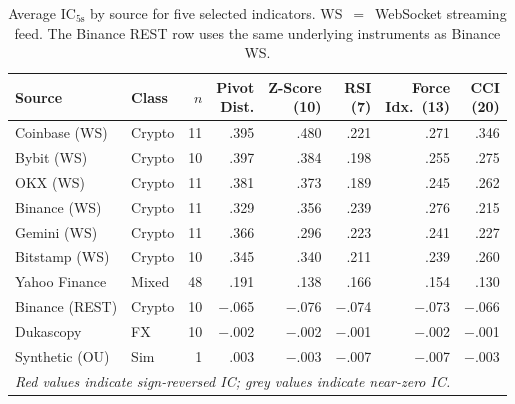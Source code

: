 \documentclass[12pt,a4paper]{article}
\theoremstyle{definition}
\theoremstyle{remark}
\newcommand{\IC}{\mathrm{IC}}
\begin{document}
\begin{table}[H]
\centering
\caption{Average $\IC_{5\text{s}}$ by source for five selected
  indicators. WS~$=$~WebSocket streaming feed. The Binance
  REST row uses the same underlying instruments as Binance WS.}
\label{tab:crossasset}
\small
\setlength{\tabcolsep}{5pt}
\begin{tabular}{llr@{\hspace{6pt}}rrrrr}
\toprule
\textbf{Source} & \textbf{Class} & $n$
  & \makecell{Pivot\\Dist.}
  & \makecell{Z-Score\\(10)}
  & \makecell{RSI\\(7)}
  & \makecell{Force\\Idx.\ (13)}
  & \makecell{CCI\\(20)} \\
\midrule
Coinbase (WS)  & Crypto & 11 & .395 & .480 & .221 & .271 & .346 \\
Bybit (WS)     & Crypto & 10 & .397 & .384 & .198 & .255 & .275 \\
OKX (WS)       & Crypto & 11 & .381 & .373 & .189 & .245 & .262 \\
Binance (WS)   & Crypto & 11 & .329 & .356 & .239 & .276 & .215 \\
Gemini (WS)    & Crypto & 11 & .366 & .296 & .223 & .241 & .227 \\
Bitstamp (WS)  & Crypto & 10 & .345 & .340 & .211 & .239 & .260 \\
Yahoo Finance  & Mixed  & 48 & .191 & .138 & .166 & .154 & .130 \\
\midrule
Binance (REST) & Crypto & 10
  & \textcolor{accent}{$-$.065}
  & \textcolor{accent}{$-$.076}
  & \textcolor{accent}{$-$.074}
  & \textcolor{accent}{$-$.073}
  & \textcolor{accent}{$-$.066} \\
Dukascopy      & FX     & 10
  & \textcolor{gray1}{$-$.002}
  & \textcolor{gray1}{$-$.002}
  & \textcolor{gray1}{$-$.001}
  & \textcolor{gray1}{$-$.002}
  & \textcolor{gray1}{$-$.001} \\
Synthetic (OU) & Sim    &  1
  & \textcolor{gray1}{.003}
  & \textcolor{gray1}{$-$.003}
  & \textcolor{gray1}{$-$.007}
  & \textcolor{gray1}{$-$.007}
  & \textcolor{gray1}{$-$.003} \\
\bottomrule
\multicolumn{8}{l}{\small\itshape Red values indicate sign-reversed IC;
  grey values indicate near-zero IC.}
\end{tabular}
\end{table}
\end{document}
